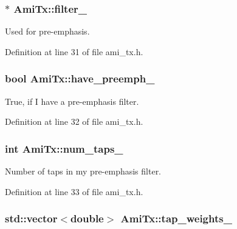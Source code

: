\subsubsection[{filter\+\_\+}]{$\ast$ Ami\+Tx\+::filter\+\_\+\hspace{0.3cm}{\ttfamily [protected]}}\label{class_ami_tx_a1eb407f2a0aa1010c5d381c172f8425d}


Used for pre-\/emphasis. 



Definition at line 31 of file ami\+\_\+tx.\+h.

\hypertarget{class_ami_tx_a8e07817524a3626aaa432bcbe7cad30f}{}
\subsubsection[{have\+\_\+preemph\+\_\+}]{\setlength{\rightskip}{0pt plus 5cm}bool Ami\+Tx\+::have\+\_\+preemph\+\_\+\hspace{0.3cm}{\ttfamily [protected]}}\label{class_ami_tx_a8e07817524a3626aaa432bcbe7cad30f}


True, if I have a pre-\/emphasis filter. 



Definition at line 32 of file ami\+\_\+tx.\+h.

\hypertarget{class_ami_tx_a166891685483a94632bbcd4e2afebf88}{}
\subsubsection[{num\+\_\+taps\+\_\+}]{\setlength{\rightskip}{0pt plus 5cm}int Ami\+Tx\+::num\+\_\+taps\+\_\+\hspace{0.3cm}{\ttfamily [protected]}}\label{class_ami_tx_a166891685483a94632bbcd4e2afebf88}


Number of taps in my pre-\/emphasis filter. 



Definition at line 33 of file ami\+\_\+tx.\+h.

\hypertarget{class_ami_tx_ab4878fcf087a793ca120ab1e30cabed5}{}
\subsubsection[{tap\+\_\+weights\+\_\+}]{\setlength{\rightskip}{0pt plus 5cm}std\+::vector$<$double$>$ Ami\+Tx\+::tap\+\_\+weights\+\_\+\hspace{0.3cm}{\ttfamily [protected]}}\label{class_ami_tx_ab4878fcf087a793ca120ab1e30cabed5}


